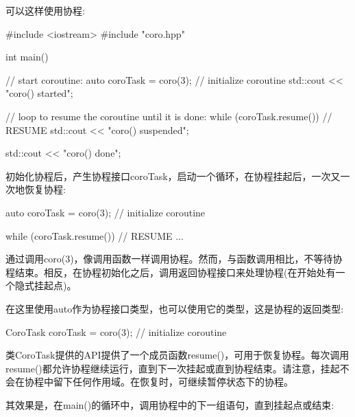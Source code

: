 
可以这样使用协程:


\begin{cpp}
#include <iostream>
#include "coro.hpp"

int main()
{
	// start coroutine:
	auto coroTask = coro(3); // initialize coroutine
	std::cout << "coro() started\n";

	// loop to resume the coroutine until it is done:
	while (coroTask.resume()) { // RESUME
		std::cout << "coro() suspended\n";
	}

	std::cout << "coro() done\n";
}
\end{cpp}

初始化协程后，产生协程接口coroTask，启动一个循环，在协程挂起后，一次又一次地恢复协程:

\begin{cpp}
auto coroTask = coro(3); // initialize coroutine

while (coroTask.resume()) { // RESUME
	...
}
\end{cpp}

通过调用coro(3)，像调用函数一样调用协程。然而，与函数调用相比，不等待协程结束。相反，在协程初始化之后，调用返回协程接口来处理协程(在开始处有一个隐式挂起点)。

在这里使用auto作为协程接口类型，也可以使用它的类型，这是协程的返回类型:

\begin{cpp}
CoroTask coroTask = coro(3); // initialize coroutine
\end{cpp}

类CoroTask提供的API提供了一个成员函数resume()，可用于恢复协程。每次调用resume()都允许协程继续运行，直到下一次挂起或直到协程结束。请注意，挂起不会在协程中留下任何作用域。在恢复时，可继续暂停状态下的协程。

其效果是，在main()的循环中，调用协程中的下一组语句，直到挂起点或结束:

